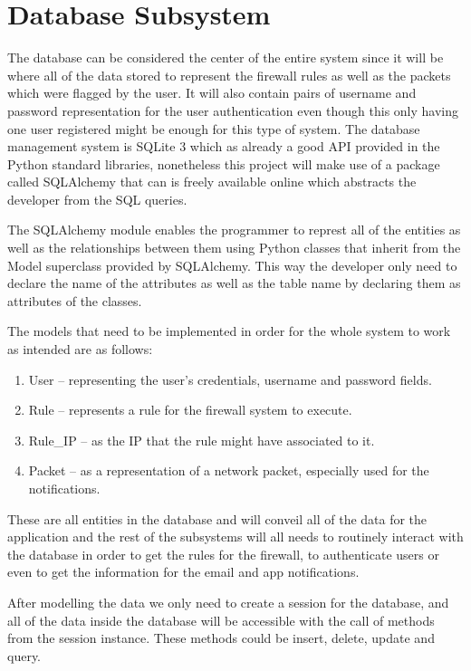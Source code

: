 \section{Database Subsystem}
\label{chap4:sec:db-sys}
The database can be considered the center of the entire system since it will be
where all of the data stored to represent the firewall rules as well as the
packets which were flagged by the user. It will also contain pairs of username
and password representation for the user authentication even though this only
having one user registered might be enough for this type of system.
The database management system is SQLite 3 which as already a good API provided
in the Python standard libraries, nonetheless this project will make use of a
package called SQLAlchemy that can is freely available online which abstracts
the developer from the SQL queries.

The SQLAlchemy module enables the programmer to represt all of the entities as
well as the relationships between them using Python classes that inherit from
the Model superclass provided by SQLAlchemy. This way the developer only need to
declare the name of the attributes as well as the table name by declaring them
as attributes of the classes.

The models that need to be implemented in order for the whole system to work as
intended are as follows:
\begin{enumerate}
	\item User -- representing the user's credentials, username and password
		fields.
	\item Rule -- represents a rule for the firewall system to execute.
	\item Rule_IP -- as the IP that the rule might have associated to it.
	\item Packet -- as a representation of a network packet, especially used for
		the notifications.
\end{enumerate}

These are all entities in the database and will conveil all of the data for the
application and the rest of the subsystems will all needs to routinely interact
with the database in order to get the rules for the firewall, to authenticate
users or even to get the information for the email and app notifications.


After modelling the data we only need to create a session for the database, and
all of the data inside the database will be accessible with the call of methods
from the session instance. These methods could be insert, delete, update and
query.

